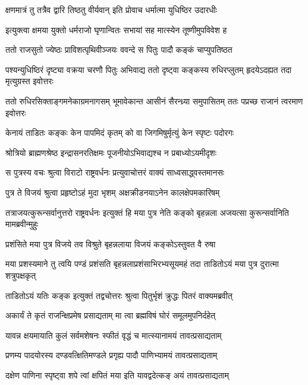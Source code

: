 \twolineshloka
{क्षणमात्रं तु तत्रैव द्वारि तिष्ठतु वीर्यवान्}
{इति प्रोवाच धर्मात्मा युधिष्ठिर उदारधीः}


\twolineshloka
{इत्युक्त्वा क्षमया युक्तो धर्मराजो घृणान्वितः}
{सभायां सह मात्स्येन तूष्णीमुपविवेश ह}


\twolineshloka
{ततो राजसुतो ज्येष्ठः प्राविशत्पृथिवीञ्जयः}
{ववन्दे स पितुः पादौ कङ्कं चाप्युपतिष्ठत}


\threelineshloka
{पश्यन्युधिष्ठिरं दृष्ट्या वक्रया चरणौ पितुः}
{अभिवाद्य ततो दृष्ट्वा कङ्कस्य रुधिरप्लुतम्}
{हृदयेऽदह्यत तदा मृत्युग्रस्त इवोत्तरः}


\threelineshloka
{ततो रुधिरसिक्ताङ्गमनेकाग्रमनागसम्}
{भूमावेकान्त आसीनं सैरन्ध्र्या समुपासितम्}
{ततः पप्रच्छ राजानं त्वरमाण इवोत्तरः}


\twolineshloka
{केनायं ताडितः कङ्कः केन पापमिदं कृतम्}
{को वा जिगमिषुर्मृत्युं केन स्पृष्टः पदोरगः}


\twolineshloka
{श्रोत्रियो ब्राह्मणश्रेष्ठ इन्द्रासनरतिक्षमः}
{पूजनीयोऽभिवाद्यश्च न प्रबाध्योऽयमीदृशः}



\twolineshloka
{स पुत्रस्य वचः श्रुत्वा विराटो राष्ट्रवर्धनः}
{प्रत्युवाचोत्तरं वाक्यं साध्वसाद्ध्वस्तमानसः}


\twolineshloka
{पुत्र ते विजयं श्रुत्वा प्रहृष्टोऽहं मुदा भृशम्}
{अक्षक्रीडनयाऽनेन कालक्षेपमकारिषम्}


\threelineshloka
{तत्राजयत्कुरून्सर्वानुत्तरो राष्ट्रवर्धनः}
{इत्युक्तं हि मया पुत्र नेति कङ्को बृहन्नला}
{अजयत्सा कुरून्सर्वानिति मामब्रवीन्मुहुः}


\twolineshloka
{प्रशंसिते मया पुत्र विजये तव विश्रुते}
{बृहन्नलाया विजयं कङ्कोऽस्तुवत वै रुषा}


\threelineshloka
{मया प्रशस्यमाने तु त्वयि पण्डं प्रशंसति}
{बृहन्नलाप्रशंसाभिरभ्यसूयमहं तदा}
{ताडितोऽयं मया पुत्र दुरात्मा शत्रुपक्षकृत्}


\twolineshloka
{ताडितोऽयं यतिः कङ्क इत्युक्तं तद्वचोत्तरः}
{श्रुत्वा पितुर्भृशं क्रुद्धः पितरं वाक्यमब्रवीत्}


\twolineshloka
{अकार्यं ते कृतं राजन्क्षिप्रमेष प्रसाद्यताम्}
{मा त्वा ब्रह्मविषं घोरं समूलमुपनिर्दहेत्}


\twolineshloka
{यावन्न क्षयमायाति कुलं सर्वमशेषनः}
{स्फीतं वृद्धं च मात्स्यानामयं तावत्प्रसाद्यताम्}


\twolineshloka
{प्रणम्य पादयोरस्य दण्डवत्क्षितिमण्डले}
{प्रगृह्य पादौ पाणिभ्यामयं तावत्प्रसाद्यताम्}


\twolineshloka
{दक्षेण पाणिना स्पृष्ट्वा शपे त्वां क्षपितं मया}
{इति यावद्वदेत्कङ् अयं तावत्प्रसाद्यताम्}


